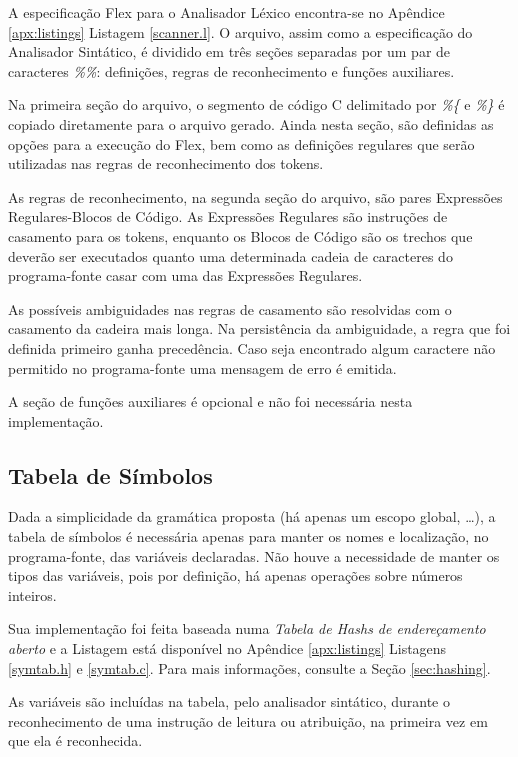 A especificação Flex para o Analisador Léxico encontra-se no Apêndice
\ref{apx:listings} Listagem \ref{scanner.l}. O arquivo, assim como a
especificação do Analisador Sintático, é dividido em três seções separadas
por um par de caracteres \emph{\%\%}: definições, regras de reconhecimento e
funções auxiliares.

Na primeira seção do arquivo, o segmento de código C delimitado por
\emph{\%\{} e \emph{\%\}} é copiado diretamente para o arquivo gerado. Ainda
nesta seção, são definidas as opções para a execução do Flex, bem como as
definições regulares que serão utilizadas nas regras de reconhecimento dos
tokens.

As regras de reconhecimento, na segunda seção do arquivo, são pares Expressões
Regulares-Blocos de Código. As Expressões Regulares são instruções de
casamento para os tokens, enquanto os Blocos de Código são os trechos que
deverão ser executados quanto uma determinada cadeia de caracteres do
programa-fonte casar com uma das Expressões Regulares.

As possíveis ambiguidades nas regras de casamento são resolvidas com o
casamento da cadeira mais longa. Na persistência da ambiguidade, a regra que
foi definida primeiro ganha precedência. Caso seja encontrado algum caractere
não permitido no programa-fonte uma mensagem de erro é emitida.

A seção de funções auxiliares é opcional e não foi necessária nesta
implementação.


\subsection{Tabela de Símbolos}
\label{sec:implement_symtab}

Dada a simplicidade da gramática proposta (há apenas um escopo global,
\dots), a tabela de símbolos é necessária apenas para manter os nomes e
localização, no programa-fonte, das variáveis declaradas. Não houve a
necessidade de manter os tipos das variáveis, pois por definição, há
apenas operações sobre números inteiros.

Sua implementação foi feita baseada numa \emph{Tabela de Hashs de
endereçamento aberto} e a Listagem está disponível no Apêndice
\ref{apx:listings} Listagens \ref{symtab.h} e \ref{symtab.c}. Para
mais informações, consulte a Seção \ref{sec:hashing}.

As variáveis são incluídas na tabela, pelo analisador sintático, durante o
reconhecimento de uma instrução de leitura ou atribuição, na primeira vez em
que ela é reconhecida.

